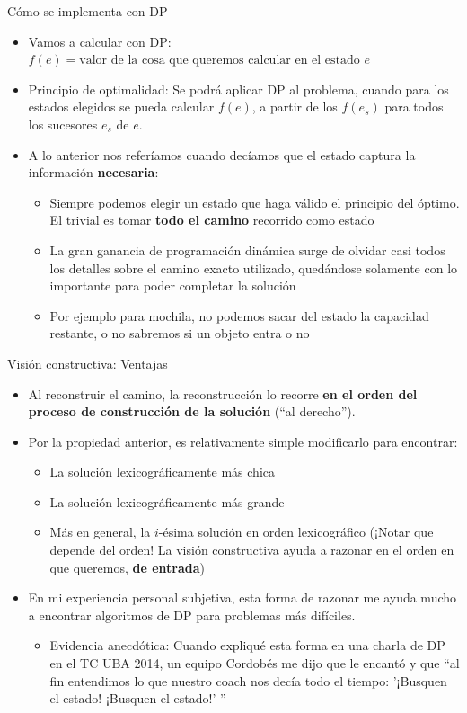 \documentclass{beamer}
\begin{document}
\begin{frame}{Cómo se implementa con DP}
	\begin{itemize}
		\item Vamos a calcular con DP: $f(e) = \mbox{valor de la cosa que queremos calcular en el estado $e$}$
		\item Principio de optimalidad: Se podrá aplicar DP al problema, cuando para los estados elegidos se pueda calcular $f(e)$, a partir de los
		     $f(e_s)$ para todos los sucesores $e_s$ de $e$.
		\item A lo anterior nos referíamos cuando decíamos que el estado captura la información \textbf{necesaria}:
		   \begin{itemize}
			  \item Siempre podemos elegir un estado que haga válido el principio del óptimo. El trivial es tomar \textbf{todo el camino} recorrido como estado
			  \item La gran ganancia de programación dinámica surge de olvidar casi todos los detalles sobre el camino exacto utilizado, quedándose solamente con lo importante para poder completar la solución
			  \item Por ejemplo para mochila, no podemos sacar del estado la capacidad restante, o no sabremos si un objeto entra o no
		   \end{itemize}
	\end{itemize}
\end{frame}


\begin{frame}{Visión constructiva: Ventajas}
	\begin{itemize}
		\item Al reconstruir el camino, la reconstrucción lo recorre \textbf{en el orden del proceso de construcción de la solución} (``al derecho'').
		\item Por la propiedad anterior, es relativamente simple modificarlo para encontrar:
			\begin{itemize}
				\item La solución lexicográficamente más chica
				\item La solución lexicográficamente más grande
				\item Más en general, la $i$-ésima solución en orden lexicográfico (¡Notar que depende del orden! La visión constructiva ayuda a razonar en el orden en que queremos, \textbf{de entrada})
			\end{itemize}
		\item En mi experiencia personal subjetiva, esta forma de razonar me ayuda mucho a encontrar algoritmos de DP para problemas más difíciles.
		   \begin{itemize}
			\item Evidencia anecdótica: Cuando expliqué esta forma en una charla de DP en el TC UBA 2014, un equipo Cordobés me dijo que le encantó y que ``al fin entendimos lo que nuestro coach nos decía todo el tiempo: '¡Busquen el estado! ¡Busquen el estado!' ''
		   \end{itemize}
	\end{itemize}
\end{frame}
\end{document}
